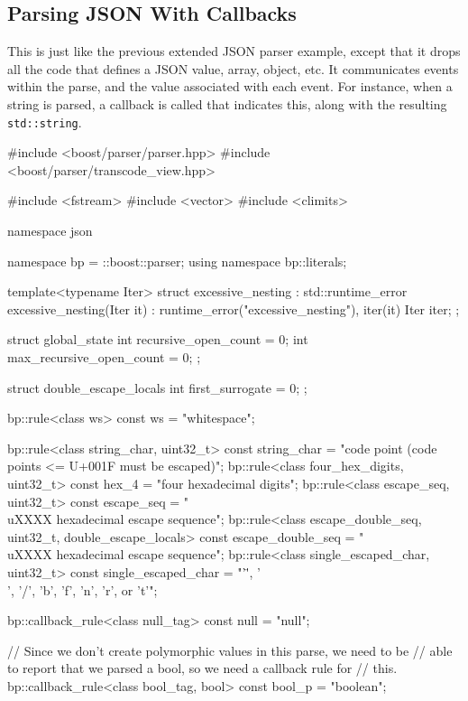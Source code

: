 \subsection{Parsing JSON With Callbacks}

This is just like the previous extended JSON parser example, except that it drops all the code that defines a JSON value, array, object, etc. It communicates events within the parse, and the value associated with each event. For instance, when a string is parsed, a callback is called that indicates this, along with the resulting \texttt{std::string}.

\begin{code}
#include <boost/parser/parser.hpp>
#include <boost/parser/transcode_view.hpp>

#include <fstream>
#include <vector>
#include <climits>


namespace json {

    namespace bp = ::boost::parser;
    using namespace bp::literals;

    template<typename Iter>
    struct excessive_nesting : std::runtime_error
    {
        excessive_nesting(Iter it) :
            runtime_error("excessive_nesting"), iter(it)
        {}
        Iter iter;
    };


    struct global_state
    {
        int recursive_open_count = 0;
        int max_recursive_open_count = 0;
    };

    struct double_escape_locals
    {
        int first_surrogate = 0;
    };


    bp::rule<class ws> const ws = "whitespace";

    bp::rule<class string_char, uint32_t> const string_char =
        "code point (code points <= U+001F must be escaped)";
    bp::rule<class four_hex_digits, uint32_t> const hex_4 =
        "four hexadecimal digits";
    bp::rule<class escape_seq, uint32_t> const escape_seq =
        "\\uXXXX hexadecimal escape sequence";
    bp::rule<class escape_double_seq, uint32_t, double_escape_locals> const
        escape_double_seq = "\\uXXXX hexadecimal escape sequence";
    bp::rule<class single_escaped_char, uint32_t> const single_escaped_char =
        "'\"', '\\', '/', 'b', 'f', 'n', 'r', or 't'";

    bp::callback_rule<class null_tag> const null = "null";

    // Since we don't create polymorphic values in this parse, we need to be
    // able to report that we parsed a bool, so we need a callback rule for
    // this.
    bp::callback_rule<class bool_tag, bool> const bool_p = "boolean";

}
\end{code}

